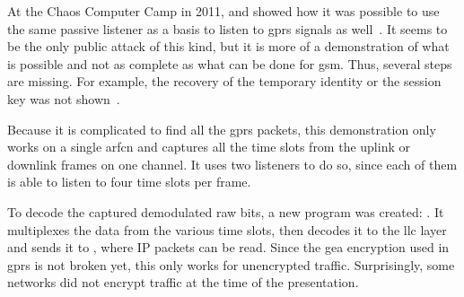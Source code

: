       At the Chaos Computer Camp in 2011,  and
       showed how it was possible to use the same
      passive listener as a basis to listen to \gls{gprs} signals as
      well~\cite{melette_gprs_2011}. It seems to be the only public
      attack of this kind, but it is more of a demonstration of what is
      possible and not as complete as what can be done for \gls{gsm}.
      Thus, several steps are missing. For example, the recovery of the
      temporary identity or the session key was not
      shown~\cite{srlabs_gprs_????}.

      Because it is complicated to find all the \gls{gprs} packets, this
      demonstration only works on a single \gls{arfcn} and captures all
      the time slots from the uplink or downlink frames on one channel.
      It uses two listeners to do so, since each of them is able to
      listen to four time slots per frame.

      To decode the captured demodulated raw bits, a new program was
      created: . It multiplexes the data from the
      various time slots, then decodes it to the \gls{llc} layer and
      sends it to , where IP packets can be read. Since
      the \gls{gea} encryption used in \gls{gprs} is not broken yet,
      this only works for unencrypted traffic. Surprisingly, some
      networks did not encrypt traffic at the time of the
      presentation.

  \iffalse

  encryption ss7 : MAP_SEND_AUTHENTICATION_INFO service

  http://baseband-devel.722152.n3.nabble.com/GPRS-Vs-EDGE-Trying-to-decode-my-own-sessions-td3288960.html

  http://baseband-devel.722152.n3.nabble.com/uplink-sniffing-td3531044.html

  http://baseband-devel.722152.n3.nabble.com/GPRS-decode-tutorial-td3437051.html

  http://baseband-devel.722152.n3.nabble.com/Sniffing-GPRS-td3712433.html

  http://baseband-devel.722152.n3.nabble.com/Sniffing-GPRS-td3712433.html

  http://baseband-devel.722152.n3.nabble.com/Working-of-ccch-scan-and-capturing-the-SDCCH-td4025206.html#a4025213

  \fi
